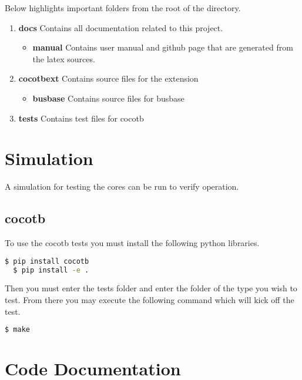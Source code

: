 \par
Below highlights important folders from the root of the directory.

\begin{enumerate}
  \item \textbf{docs} Contains all documentation related to this project.
    \begin{itemize}
      \item \textbf{manual} Contains user manual and github page that are generated from the latex sources.
    \end{itemize}
  \item \textbf{cocotbext} Contains source files for the extension
    \begin{itemize}
      \item \textbf{busbase} Contains source files for busbase
    \end{itemize}
  \item \textbf{tests} Contains test files for cocotb
\end{enumerate}

\newpage

\section{Simulation}
\par
A simulation for testing the cores can be run to verify operation.

\subsection{cocotb}
\par
To use the cocotb tests you must install the following python libraries.
\begin{lstlisting}[language=bash]
  $ pip install cocotb
  $ pip install -e .
\end{lstlisting}

Then you must enter the tests folder and enter the folder of the type you wish to test. From there you may execute the following command
which will kick off the test.
\begin{lstlisting}[language=bash]
  $ make
\end{lstlisting}

\newpage

\section{Code Documentation} \label{Code Documentation}

